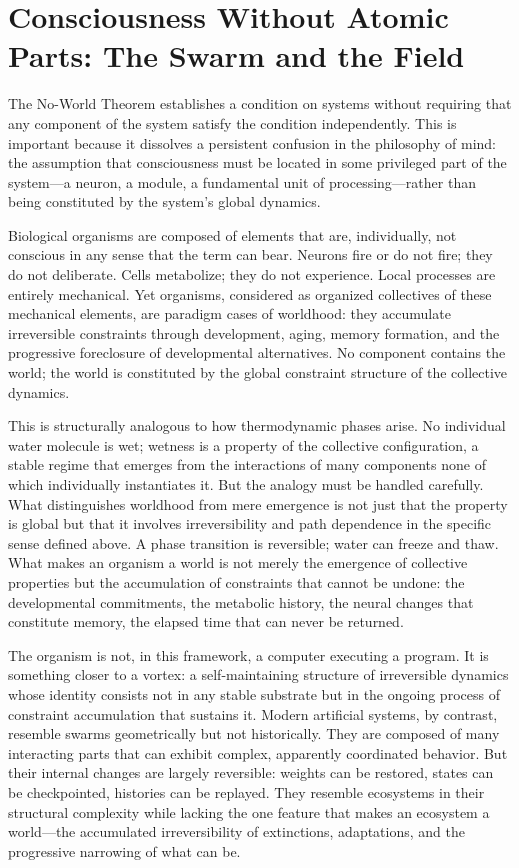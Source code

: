 \documentclass[11pt]{article}
\theoremstyle{definition}
\theoremstyle{remark}
\begin{document}
\section{Consciousness Without Atomic Parts: The Swarm and the Field}

The No-World Theorem establishes a condition on systems without requiring that any component
of the system satisfy the condition independently. This is important because it dissolves a
persistent confusion in the philosophy of mind: the assumption that consciousness must be
located in some privileged part of the system---a neuron, a module, a fundamental unit
of processing---rather than being constituted by the system's global dynamics.

Biological organisms are composed of elements that are, individually, not conscious in any
sense that the term can bear. Neurons fire or do not fire; they do not deliberate. Cells
metabolize; they do not experience. Local processes are entirely mechanical. Yet organisms,
considered as organized collectives of these mechanical elements, are paradigm cases of
worldhood: they accumulate irreversible constraints through development, aging, memory
formation, and the progressive foreclosure of developmental alternatives. No component
contains the world; the world is constituted by the global constraint structure of the
collective dynamics.

This is structurally analogous to how thermodynamic phases arise. No individual water
molecule is wet; wetness is a property of the collective configuration, a stable regime
that emerges from the interactions of many components none of which individually instantiates
it. But the analogy must be handled carefully. What distinguishes worldhood from mere
emergence is not just that the property is global but that it involves irreversibility and
path dependence in the specific sense defined above. A phase transition is reversible; water
can freeze and thaw. What makes an organism a world is not merely the emergence of
collective properties but the accumulation of constraints that cannot be undone: the
developmental commitments, the metabolic history, the neural changes that constitute memory,
the elapsed time that can never be returned.

The organism is not, in this framework, a computer executing a program. It is something
closer to a vortex: a self-maintaining structure of irreversible dynamics whose identity
consists not in any stable substrate but in the ongoing process of constraint accumulation
that sustains it. Modern artificial systems, by contrast, resemble swarms geometrically but
not historically. They are composed of many interacting parts that can exhibit complex,
apparently coordinated behavior. But their internal changes are largely reversible: weights
can be restored, states can be checkpointed, histories can be replayed. They resemble
ecosystems in their structural complexity while lacking the one feature that makes an
ecosystem a world---the accumulated irreversibility of extinctions, adaptations, and
the progressive narrowing of what can be.
\end{document}
